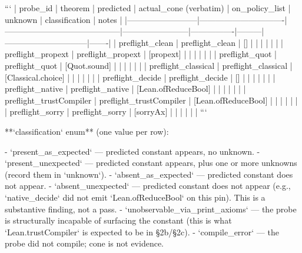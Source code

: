 ```
| probe_id                 | theorem                       | predicted                                | actual_cone (verbatim) | on_policy_list | unknown | classification               | notes |
|--------------------------|-------------------------------|------------------------------------------|------------------------|----------------|---------|------------------------------|-------|
| preflight_clean          | preflight_clean               | []                                       |                        |                |         |                              |       |
| preflight_propext        | preflight_propext             | [propext]                                |                        |                |         |                              |       |
| preflight_quot           | preflight_quot                | [Quot.sound]                             |                        |                |         |                              |       |
| preflight_classical      | preflight_classical           | [Classical.choice]                       |                        |                |         |                              |       |
| preflight_decide         | preflight_decide              | []                                       |                        |                |         |                              |       |
| preflight_native         | preflight_native              | [Lean.ofReduceBool]                      |                        |                |         |                              |       |
| preflight_trustCompiler  | preflight_trustCompiler       | [Lean.ofReduceBool]                      |                        |                |         |                              |       |
| preflight_sorry          | preflight_sorry               | [sorryAx]                                |                        |                |         |                              |       |
```

**`classification` enum** (one value per row):

- `present_as_expected` — predicted constant appears, no unknown.
- `present_unexpected` — predicted constant appears, plus one or more unknowns (record them in `unknown`).
- `absent_as_expected` — predicted constant does not appear.
- `absent_unexpected` — predicted constant does not appear (e.g., `native_decide` did not emit `Lean.ofReduceBool` on this pin). This is a substantive finding, not a pass.
- `unobservable_via_print_axioms` — the probe is structurally incapable of surfacing the constant (this is what `Lean.trustCompiler` is expected to be in §2b/§2c).
- `compile_error` — the probe did not compile; cone is not evidence.

